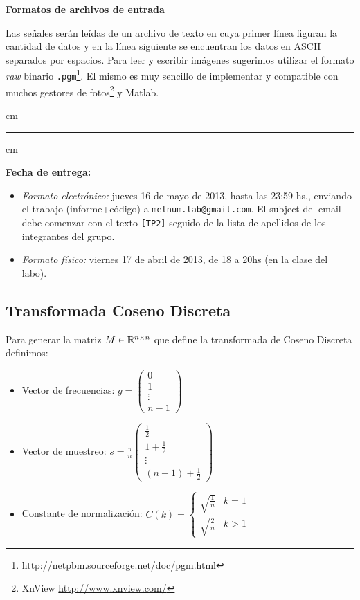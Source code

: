 {\bf Formatos de archivos de entrada}

Las se\~nales ser\'an le\'idas de un archivo de texto en cuya primer l\'inea figuran la cantidad de datos y en la l\'inea siguiente se encuentran los datos en ASCII separados por espacios. Para leer y escribir im\'agenes sugerimos utilizar el formato {\em raw} binario \texttt{.pgm}\footnote{\url{http://netpbm.sourceforge.net/doc/pgm.html}}. 
El mismo es muy sencillo de implementar y compatible con muchos gestores de fotos\footnote{XnView \url{http://www.xnview.com/}} y Matlab.

 cm
\hrule
{} cm

{\bf Fecha de entrega:} 
\begin{itemize}
\item \textsl{Formato electr\'onico:} jueves 16 de mayo de 2013, hasta las 23:59 hs., enviando el trabajo (informe+c\'odigo) a \texttt{metnum.lab@gmail.com}. El subject del email debe comenzar con el texto \verb|[TP2]| seguido de la lista de apellidos de los integrantes del grupo. 
\item \textsl{Formato f\'isico:} viernes 17 de abril de 2013, de 18 a 20hs (en la clase del labo).
\end{itemize}

\subsection{Transformada Coseno Discreta}\label{sec:dct}

Para generar la matriz $M\in\mathbb{R}^{n\times n}$ que define la transformada de Coseno Discreta definimos: 
\begin{itemize}
 \item Vector de frecuencias:  $g = \left(\begin{array}{c} 0 \\ 1 \\ \vdots \\ n-1 \end{array} \right)$
 \item Vector de muestreo: $ s= {\displaystyle \frac{\pi}{n} }\left(\begin{array}{c} \frac{1}{2} \\1+\frac{1}{2} \\  \vdots \\ (n-1)+\frac{1}{2} \end{array} \right) $
 \item Constante de normalizaci\'on: $C(k) = \left\{ \begin{array}{lr}\sqrt{\frac{1}{n}} & k=1 \\ \sqrt{\frac{2}{n}} & k > 1 \end{array} \right.$
\end{itemize}

